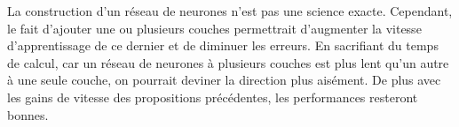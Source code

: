 \documentclass[a4paper, 11pt]{article}
\begin{document}
La construction d'un réseau de neurones n'est pas une science exacte. Cependant, le fait d'ajouter une ou plusieurs couches permettrait d'augmenter la 
vitesse d'apprentissage de ce dernier et de diminuer les erreurs. En sacrifiant du temps de calcul, car un réseau de neurones à plusieurs couches est plus
lent qu'un autre à une seule couche, on pourrait deviner la direction plus aisément. De plus avec les gains de vitesse des propositions précédentes, les
performances resteront bonnes.

\newpage

\nocite{*}

\end{document}
